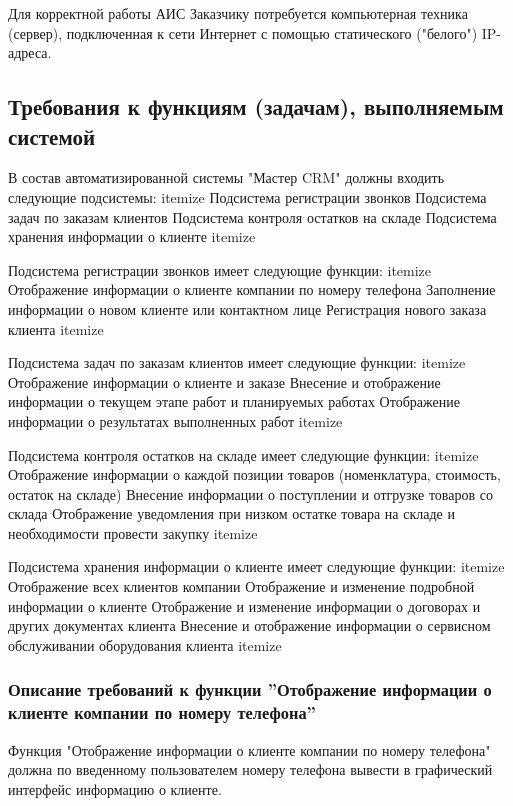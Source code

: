 \documentclass[russian, utf8, 12pt,pointsubsection,floatsubsection]{eskdtext}
\begin{document}

Для корректной работы АИС Заказчику потребуется компьютерная техника (сервер), подключенная к сети Интернет с помощью статического ("белого") IP-адреса.

\subsection{Требования к функциям (задачам), выполняемым системой}

В состав автоматизированной системы "Мастер CRM" должны входить следующие подсистемы:
itemize
Подсистема регистрации звонков
Подсистема задач по заказам клиентов
Подсистема контроля остатков на складе
Подсистема хранения информации о клиенте
itemize

Подсистема регистрации звонков имеет следующие функции:
itemize
Отображение информации о клиенте компании по номеру телефона
Заполнение информации о новом клиенте или контактном лице
Регистрация нового заказа клиента
itemize

Подсистема задач по заказам клиентов имеет следующие функции:
itemize
Отображение информации о клиенте и заказе
Внесение и отображение информации о текущем этапе работ и планируемых работах
Отображение информации о результатах выполненных работ
itemize

Подсистема контроля остатков на складе имеет следующие функции:
itemize
Отображение информации о каждой позиции товаров (номенклатура, стоимость, остаток на складе)
Внесение информации о поступлении и отгрузке товаров со склада
Отображение уведомления при низком остатке товара на складе и необходимости провести закупку
itemize

Подсистема хранения информации о клиенте имеет следующие функции:
itemize
Отображение всех клиентов компании
Отображение и изменение подробной информации о клиенте
Отображение и изменение информации о договорах и других документах клиента
Внесение и отображение информации о сервисном обслуживании оборудования клиента
itemize




\subsubsection{Описание требований к функции ''Отображение информации о клиенте компании по номеру телефона''}
Функция "Отображение информации о клиенте компании по номеру телефона" должна по введенному пользователем номеру телефона вывести в графический интерфейс информацию о клиенте.
\end{document}
